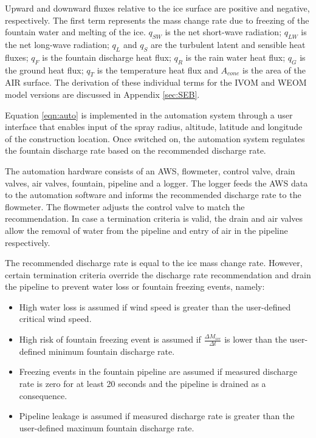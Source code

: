\documentclass[tc, manuscript]{copernicus}
\begin{document}
Upward and downward fluxes relative to the ice surface are positive and negative, respectively. The first term
represents the mass change rate due to freezing of the fountain water and melting of the ice. $q_{SW}$ is the
net short-wave radiation; $q_{LW}$ is the net long-wave radiation; $q_{L}$ and $q_{S}$ are the turbulent latent
and sensible heat fluxes; $q_{F}$ is the fountain discharge heat flux; $q_{R}$ is the rain water heat flux;
$q_{G}$ is the ground heat flux; $q_{T}$ is the temperature heat flux and $A_{cone}$ is the area of the AIR
surface. The derivation of these individual terms for the IVOM and WEOM model versions are discussed in 
Appendix \ref{sec:SEB}.

Equation \ref{eqn:auto} is implemented in the automation system through a user interface that enables input of
the spray radius, altitude, latitude and longitude of the construction location. Once switched on, the
automation system regulates the fountain discharge rate based on the recommended discharge rate.

The automation hardware consists of an AWS, flowmeter, control valve, drain valves, air valves, fountain,
pipeline and a logger. The logger feeds the AWS data to the automation software and informs the recommended
discharge rate to the flowmeter. The flowmeter adjusts the control valve to match the recommendation. In case a
termination criteria is valid, the drain and air valves allow the removal of water from the pipeline and entry
of air in the pipeline respectively.

The recommended discharge rate is equal to the ice mass change rate. However, certain termination criteria
override the discharge rate recommendation and drain the pipeline to prevent water loss or fountain freezing
events, namely: 

\begin{itemize}

\item High water loss is assumed if wind speed is greater than the user-defined critical wind speed.

\item High risk of fountain freezing event is assumed if $\frac{\Delta M_{ice}}{\Delta t}$ is lower than the user-defined minimum fountain discharge rate. 

\item Freezing events in the fountain pipeline are assumed if measured discharge rate is zero for at least 20 seconds and the pipeline is drained as a
  consequence.

\item Pipeline leakage is assumed if measured discharge rate is greater than the user-defined maximum fountain discharge rate.

\end{itemize}
\end{document}
